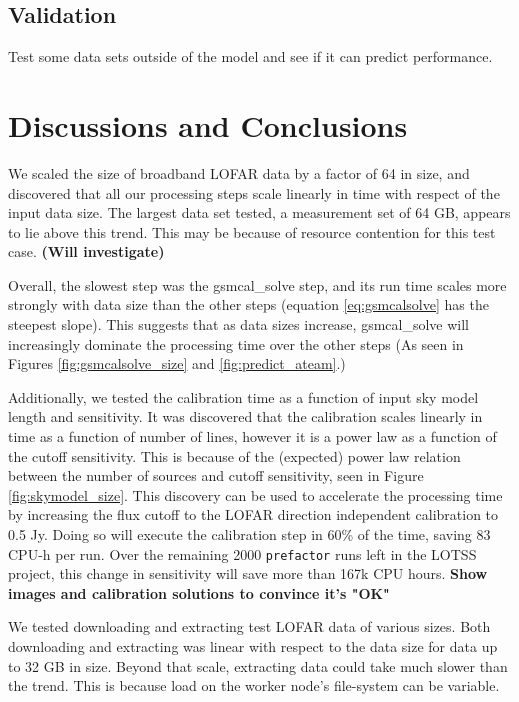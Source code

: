 \documentclass[preprint,5p]{elsarticle}
\begin{document}
\subsection{Validation}
Test some data sets outside of the model and see if it can predict performance. 


\section{Discussions and Conclusions}

We scaled the size of broadband LOFAR data by a factor of 64 in size, and discovered that all our processing steps scale linearly in time with respect of the input data size. The largest data set tested, a measurement set of 64 GB, appears to lie above this trend. This may be because of resource contention for this test case. \textbf{(Will investigate)}

Overall, the slowest step was the gsmcal\_solve step, and its run time scales more strongly with data size than the other steps (equation \ref{eq:gsmcalsolve} has the steepest slope). This suggests that as data sizes increase, gsmcal\_solve will increasingly dominate the processing time over the other steps (As seen in Figures \ref{fig:gsmcalsolve_size} and \ref{fig:predict_ateam}.)

Additionally, we tested the calibration time as a function of input sky model length and sensitivity. It was discovered that the calibration scales linearly in time as a function of number of lines, however it is a power law as a function of the cutoff sensitivity. This is because of the (expected) power law relation between the number of sources and cutoff sensitivity, seen in Figure \ref{fig:skymodel_size}. This discovery can be used to accelerate the processing time by increasing the flux cutoff to the LOFAR direction independent calibration to 0.5 Jy. Doing so will execute the calibration step in 60\% of the time, saving 83 CPU-h per run. Over the remaining 2000 \texttt{prefactor} runs left in the LOTSS project, this change in sensitivity will save more than 167k CPU hours. \textbf{Show images and calibration solutions to convince it's "OK"}

We tested downloading and extracting test LOFAR data of various sizes. Both downloading and extracting was linear with respect to the data size for data up to 32 GB in size. Beyond that scale, extracting data could take much slower than the trend. This is because load on the worker node's file-system can be variable.
\end{document}
